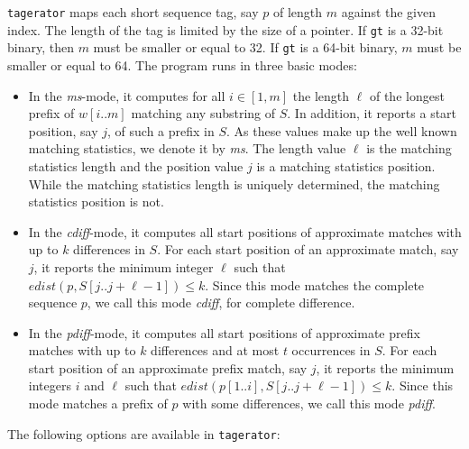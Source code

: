 \documentclass[12pt]{article}
\newcommand{\Substring}[3]{#1[#2..#3]}
\newcommand{\Program}[0]{\texttt{tagerator}\xspace}
\begin{document}
\Program maps each short sequence tag, say \(p\) of length \(m\)
against the given index. The length of the tag is limited by the
size of a pointer. If \texttt{gt} is a 32-bit binary, then \(m\) must be
smaller or equal to 32. If \texttt{gt} is a 64-bit binary, \(m\) must be 
smaller or equal to 64. The program runs in three basic modes:
\begin{itemize}
\item
In the \textit{ms}-mode, it computes for all \(i\in[1,m]\) the length \(\ell\) 
of the longest prefix of \(\Substring{w}{i}{m}\) matching any substring of 
\(S\).
In addition, it reports a start position, say \(j\), of such a prefix in \(S\).
As these values make up the well known matching statistics, we denote 
it by \textit{ms}. The length value \(\ell\) is the matching statistics length
and the position value \(j\) is a matching statistics position.
While the matching statistics length is uniquely determined, the 
matching statistics position is not.
\item
In the \textit{cdiff}-mode, it computes all start positions of approximate 
matches with up to \(k\) differences in \(S\). For each start position of 
an approximate match, say \(j\), it reports the minimum integer \(\ell\) such 
that \(edist(p,\Substring{S}{j}{j+\ell-1})\leq k\). Since this mode matches
the complete sequence \(p\), we call this mode \textit{cdiff},
for complete difference.
\item
In the \textit{pdiff}-mode, it computes all start positions of approximate 
prefix matches with up to \(k\) differences and at most \(t\) occurrences in 
\(S\). For each start position of an approximate prefix match, say \(j\), it 
reports the minimum integers \(i\) and \(\ell\) such that 
\(edist(\Substring{p}{1}{i},\Substring{S}{j}{j+\ell-1})\leq k\). Since this 
mode matches a prefix of \(p\) with some differences, we call this mode 
\textit{pdiff}.
\end{itemize}

The following options are available in \Program:
\end{document}
